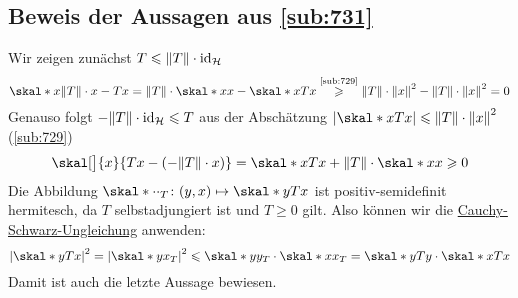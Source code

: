 \subsection{Beweis der Aussagen aus \ref{sub:731}} %
\label{sub:bew_731}
Wir zeigen zunächst $T \le \norm{T} \cdot \id_{\mathcal{H}}$
\[
	\skal*{x}{\norm{T} \cdot x - T x} = \norm{T}\cdot \skal*{x}{x} - \skal*{x}{T x} \stackrel{\mbox{\scriptsize \ref{sub:729}}}{\ge} \norm{T} \cdot \norm{x}^2 - 
	\norm{T} \cdot \norm{x}^2 = 0  
\]
Genauso folgt $-\norm{T} \cdot \id_{\mathcal{H}} \le T$ aus der Abschätzung $\abs*{\skal*{x}{Tx}} \le \norm{T} \cdot \norm{x}^2$ (\ref{sub:729})
\[
	\skal[\big]{x}{T x - (- \norm{T}\cdot x)} = \skal*{x}{T x} + \norm{T}\cdot \skal*{x}{x} \ge 0 
\]
Die Abbildung $\skal*{\cdot}{\cdot}_T \colon  (y,x) \mapsto \skal*{y}{T x}$ ist positiv-semidefinit hermitesch, da $T$ selbstadjungiert ist und $T\ge 0$ gilt. Also können 
wir die \hyperref[sub:74]{Cauchy-Schwarz-Ungleichung} anwenden:
\[
	\abs*{\skal*{y}{Tx}}^2=\abs*{\skal*{y}{x}_T}^2 \le \skal*{y}{y}_T \cdot \skal*{x}{x}_T = \skal*{y}{T y} \cdot \skal*{x}{T x}
\]
Damit ist auch die letzte Aussage bewiesen. \bewende

